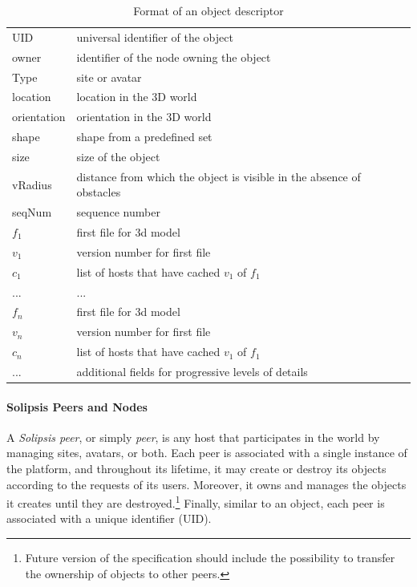 \begin{table}
\centering
\begin{tabular}{|l|p{8cm}|}
\hline
  UID & universal identifier of the object\\
  owner & identifier of the node owning the object\\
  Type & site or avatar\\
  location & location in the 3D world\\
  orientation & orientation in the 3D world\\
  shape& shape from a predefined set\\
  size & size of the object\\
  vRadius & distance from which the object is visible in the absence
  of obstacles\\
  \hline
  seqNum & sequence number\\
  \hline
  $f_1$& first file for 3d model\\
  $v_1$& version number for first file\\
  $c_1$& list of hosts that have cached $v_1$ of $f_1$\\
  ...& ...\\
  $f_n$& first file for 3d model\\
  $v_n$& version number for first file\\
  $c_n$& list of hosts that have cached $v_1$ of $f_1$\\
  \hline
  ... & additional fields for progressive levels of details\\
  \hline
\end{tabular}

\caption{Format of an object descriptor}
\label{tab:desc}
\end{table}

\paragraph{Solipsis Peers and Nodes}
A \emph{Solipsis peer}, or simply \emph{peer}, is any host that
participates in the \sol world by managing sites, avatars, or
both. Each peer is associated with a single instance of the \sol
platform, and throughout its lifetime, it may create or destroy its
objects according to the requests of its users. Moreover, it owns and
manages the objects it creates until they are
destroyed.\footnote{Future version of the specification should include
  the possibility to transfer the ownership of objects to other
  peers.} Finally, similar to an object, each peer is associated with
a unique identifier (UID).

